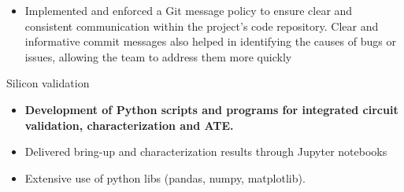 \begin{cventries}
{\begin{cvitems}
\begin{itemize}
\begin{itemize}
            \item {Implemented and enforced a Git message policy to ensure clear and consistent communication within the project's code repository. Clear and informative commit messages also helped in identifying the causes of bugs or issues, allowing the team to address them more quickly}
          \end{itemize}
        \end{itemize}
        \item {Silicon validation}
          \begin{itemize}
            \item {\textbf{Development of Python scripts and programs for integrated circuit validation, characterization and ATE.}}
            \item {Delivered bring-up and characterization results through Jupyter notebooks}
            \item {Extensive use of python libs (pandas, numpy, matplotlib).}
          \end{itemize}

\end{cvitems}}
\end{cventries}
